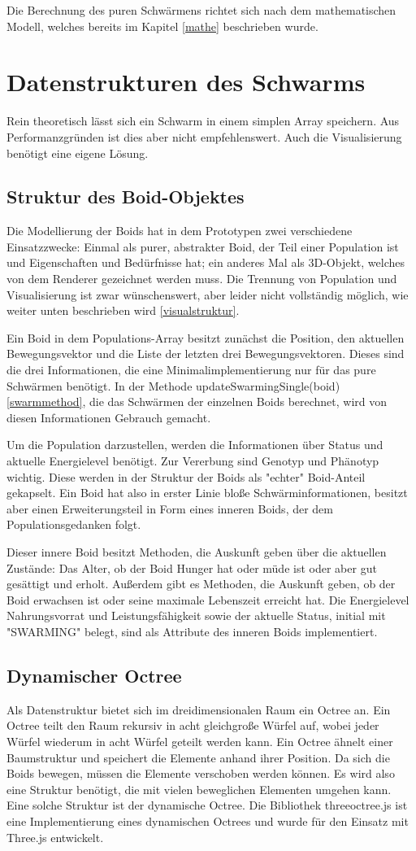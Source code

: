 \documentclass[draft=false
              ,paper=a4
              ,twoside=false
              ,fontsize=11pt
              ,headsepline
              ,BCOR10mm
              ,DIV11
              ,bibtotoc
              ,liststotoc
              ]{scrbook}
\begin{document}
Die Berechnung des puren Schwärmens richtet sich nach dem mathematischen Modell, welches bereits im Kapitel \ref{mathe} beschrieben wurde.

\section{Datenstrukturen des Schwarms}
Rein theoretisch lässt sich ein Schwarm in einem simplen Array speichern. Aus Performanzgründen ist dies aber nicht empfehlenswert. Auch die Visualisierung benötigt eine eigene Lösung.
\subsection{Struktur des Boid-Objektes}
Die Modellierung der Boids hat in dem Prototypen zwei verschiedene Einsatzzwecke: Einmal als purer, abstrakter Boid, der Teil einer Population ist und Eigenschaften und Bedürfnisse hat; ein anderes Mal als 3D-Objekt, welches von dem Renderer gezeichnet werden muss. Die Trennung von Population und Visualisierung ist zwar wünschenswert, aber leider nicht vollständig möglich, wie weiter unten beschrieben wird \ref{visualstruktur}.

Ein Boid in dem Populations-Array besitzt zunächst die Position, den aktuellen Bewegungsvektor und die Liste der letzten drei Bewegungsvektoren. Dieses sind die drei Informationen, die eine Minimalimplementierung nur für das pure Schwärmen benötigt. In der Methode updateSwarmingSingle(boid) \ref{swarmmethod}, die das Schwärmen der einzelnen Boids berechnet, wird von diesen Informationen Gebrauch gemacht.

Um die Population darzustellen, werden die Informationen über Status und aktuelle Energielevel benötigt. Zur Vererbung sind Genotyp und Phänotyp wichtig. Diese werden in der Struktur der Boids als "{}echter"{} Boid-Anteil gekapselt. Ein Boid hat also in erster Linie bloße Schwärminformationen, besitzt aber einen Erweiterungsteil in Form eines inneren Boids, der dem Populationsgedanken folgt.

Dieser innere Boid besitzt Methoden, die Auskunft geben über die aktuellen Zustände: Das Alter, ob der Boid Hunger hat oder müde ist oder aber gut gesättigt und erholt. Außerdem gibt es Methoden, die Auskunft geben, ob der Boid erwachsen ist oder seine maximale Lebenszeit erreicht hat. Die Energielevel Nahrungsvorrat und Leistungsfähigkeit sowie der aktuelle Status, initial mit "{}SWARMING"{} belegt, sind als Attribute des inneren Boids implementiert.
\subsection{Dynamischer Octree}
Als Datenstruktur bietet sich im dreidimensionalen Raum ein Octree an. Ein Octree teilt den Raum rekursiv in acht gleichgroße Würfel auf, wobei jeder Würfel wiederum in acht Würfel geteilt werden kann. Ein Octree ähnelt einer Baumstruktur und speichert die Elemente anhand ihrer Position. Da sich die Boids bewegen, müssen die Elemente verschoben werden können. Es wird also eine Struktur benötigt, die mit vielen beweglichen Elementen umgehen kann. Eine solche Struktur ist der dynamische Octree. Die Bibliothek threeoctree.js ist eine Implementierung eines dynamischen Octrees und wurde für den Einsatz mit Three.js entwickelt.
\end{document}
